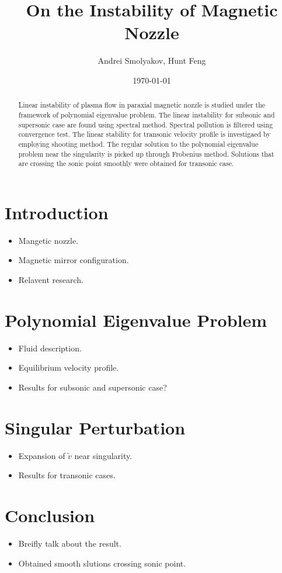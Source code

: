 \documentclass{article}
\title{On the Instability of Magnetic Nozzle}
\author{Andrei Smolyakov, Hunt Feng}
\date{\today}
\begin{document}
  \maketitle
  \begin{abstract}
    Linear instability of plasma flow in paraxial magnetic nozzle is studied under the framework of polynomial eigenvalue problem. The linear instability for subsonic and supersonic case are found using spectral method. Spectral pollution is filtered using convergence test. The linear stability for transonic velocity profile is investigaed by employing shooting method. The regular solution to the polynomial eigenvalue problem near the singularity is picked up through Frobenius method. Solutions that are crossing the sonic point smoothly were obtained for transonic case. 
  \end{abstract}

  \section{Introduction}
  \begin{itemize}
    \item Mangetic nozzle.
    \item Magnetic mirror configuration.
    \item Relavent research.
  \end{itemize}
  
  \section{Polynomial Eigenvalue Problem}
  \begin{itemize}
    \item Fluid description.
    \item Equilibrium velocity profile.
    \item Results for subsonic and supersonic case?
  \end{itemize}

  \section{Singular Perturbation}
  \begin{itemize}
    \item Expansion of $\tilde{v}$ near singularity. 
    \item Results for transonic cases.
  \end{itemize}

  \section{Conclusion}
  \begin{itemize}
    \item Breifly talk about the result.
    \item Obtained smooth slutions crossing sonic point.
  \end{itemize}

  
  
  \nocite{*}
\end{document}
